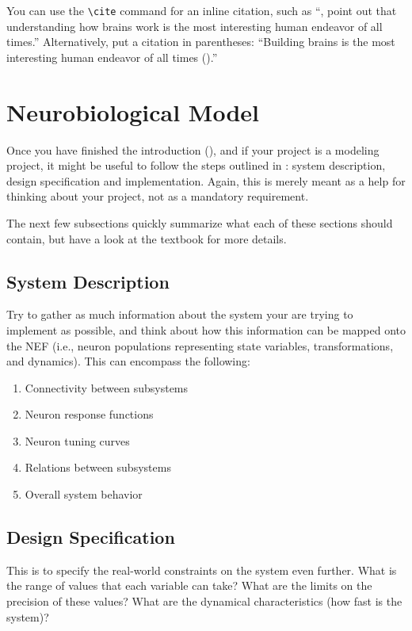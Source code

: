 \documentclass[12pt,letterpaper,oneside]{article}
\begin{document}
 	You can use the \texttt{\textbackslash cite} command for an inline citation, such as \enquote{\cite{eliasmith2003neural}, point out that understanding how brains work is the most interesting human endeavor of all times.} Alternatively, put a citation in parentheses: \enquote{Building brains is the most interesting human endeavor of all times (\cite{eliasmith2003neural}).}

	\section{Neurobiological Model}

	Once you have finished the introduction (), and if your project is a modeling project, it might be useful to follow the steps outlined in \cite{eliasmith2003neural}: system description, design specification and implementation. Again, this is merely meant as a help for thinking about your project, not as a mandatory requirement.
	
	The next few subsections quickly summarize what each of these sections should contain, but have a look at the textbook for more details.

	\subsection{System Description}

	Try to gather as much information about the system your are trying to implement as possible, and think about how this information can be mapped onto the NEF (i.e., neuron populations representing state variables, transformations, and dynamics). This can encompass the following:
	\begin{enumerate}[1.]
		\item Connectivity between subsystems
		\item Neuron response functions
		\item Neuron tuning curves
		\item Relations between subsystems
		\item Overall system behavior
	\end{enumerate}

	\subsection{Design Specification}

	This is to specify the real-world constraints on the system even further. What is the range of values that each variable can take? What are the limits on the precision of these values? What are the dynamical characteristics (how fast is the system)?
\end{document}
